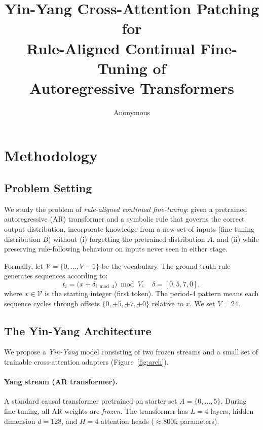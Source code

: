 \documentclass[10pt,twocolumn]{article}
\title{\textbf{Yin-Yang Cross-Attention Patching for\\
Rule-Aligned Continual Fine-Tuning of\\
Autoregressive Transformers}}
\author{Anonymous}
\date{}
\begin{document}
\maketitle

\section{Methodology}

\subsection{Problem Setting}

We study the problem of \emph{rule-aligned continual fine-tuning}: given a pretrained autoregressive (AR) transformer and a symbolic rule that governs the correct output distribution, incorporate knowledge from a new set of inputs (fine-tuning distribution $B$) without (i) forgetting the pretrained distribution $A$, and (ii) while preserving rule-following behaviour on inputs never seen in either stage.

Formally, let $\mathcal{V} = \{0, \ldots, V{-}1\}$ be the vocabulary. The ground-truth rule generates sequences according to:
\begin{equation}
  t_i = \bigl(x + \delta_{i \bmod 4}\bigr) \bmod V, \quad \delta = [0, 5, 7, 0],
  \label{eq:rule}
\end{equation}
where $x \in \mathcal{V}$ is the starting integer (first token). The period-4 pattern means each sequence cycles through offsets $\{0, +5, +7, +0\}$ relative to $x$. We set $V = 24$.

\subsection{The Yin-Yang Architecture}

We propose a \emph{Yin-Yang} model consisting of two frozen streams and a small set of trainable cross-attention adapters (Figure~\ref{fig:arch}).

\paragraph{Yang stream (AR transformer).}
A standard causal transformer pretrained on starter set $A = \{0,\ldots,5\}$. During fine-tuning, all AR weights are \emph{frozen}. The transformer has $L=4$ layers, hidden dimension $d=128$, and $H=4$ attention heads ($\approx$800k parameters).
\end{document}
